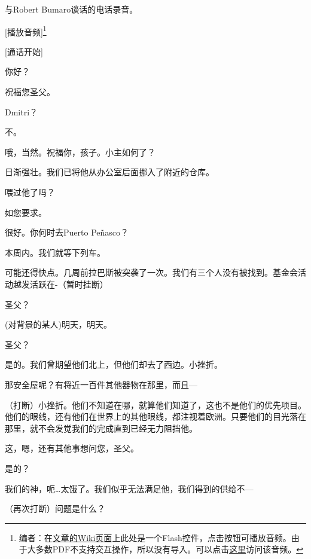 与Robert Bumaro谈话的电话录音。 \\

[播放音频]\footnote{
编者\QIS：在\href{http://scp-wiki-cn.wikidot.com/twistedgears-kaktus-proposal}{文章的Wiki页面}上此处是一个Flash控件，点击按钮可播放音频。由于大多数PDF不支持交互操作，所以没有导入。可以点击\href{http://scp-wiki.wdfiles.com/local--files/twistedgears-kaktus-proposal/bumaro.mp3}{这里}访问该音频。
}

\begin{scpbox}

[通话开始]

你好？

祝福您圣父。

Dmitri？

不。

哦，当然。祝福你，孩子。小主如何了？

日渐强壮。我们已将他从办公室后面挪入了附近的仓库。

喂过他了吗？

如您要求。

很好。你何时去Puerto Peñasco？

本周内。我们就等下列车。

可能还得快点。几周前拉巴斯被突袭了一次。我们有三个人没有被找到。基金会活动越发活跃在-（暂时挂断）

圣父？

(对背景的某人)明天，明天。

圣父？

是的。我们曾期望他们北上，但他们却去了西边。小挫折。

那安全屋呢？有将近一百件其他器物在那里，而且—

（打断）小挫折。他们不知道在哪，就算他们知道了，这也不是他们的优先项目。他们的眼线，还有他们在世界上的其他眼线，都注视着欧洲。只要他们的目光落在那里，就不会发觉我们的完成直到已经无力阻挡他。

这，嗯，还有其他事想问您，圣父。

是的？

我们的神，呃…太饿了。我们似乎无法满足他，我们得到的供给不—

（再次打断）问题是什么？


\end{scpbox}
